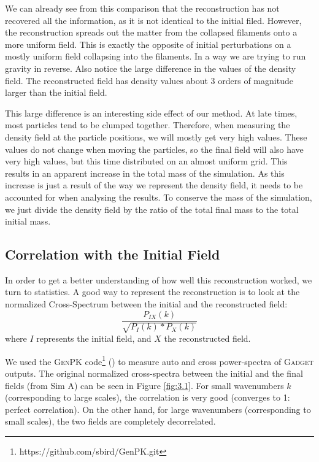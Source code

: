 We can already see from this comparison that the reconstruction has not recovered all the information, as it is not identical to the initial filed. However, the reconstruction spreads out the matter from the collapsed filaments onto a more uniform field. This is exactly the opposite of initial perturbations on a mostly uniform field collapsing into the filaments. In a way we are trying to run gravity in reverse. Also notice the large difference in the values of the density field. The reconstructed field has density values about 3 orders of magnitude larger than the initial field. 

This large difference is an interesting side effect of our method. At late times, most particles tend to be clumped together. Therefore, when measuring the density field at the particle positions, we will mostly get very high values. These values do not change when moving the particles, so the final field will also have very high values, but this time distributed on an almost uniform grid. This results in an apparent increase in the total mass of the simulation. As this increase is just a result of the way we represent the density field, it needs to be accounted for when analysing the results. To conserve the mass of the simulation, we just divide the density field by the ratio of the total final mass to the total initial mass.

\subsection{Correlation with the Initial Field}


In order to get a better understanding of how well this reconstruction worked, we turn to statistics. A good way to represent the reconstruction  is to look at the normalized Cross-Spectrum between the initial and the reconstructed field: $$ \frac{P_{IX}(k)}{\sqrt{P_I(k) * P_X(k)}} $$ where $I$ represents the initial field, and $X$ the reconstructed field. 

We used the \textsc{GenPK} code\footnote{https://github.com/sbird/GenPK.git} (\cite{2017ascl.soft06006B}) to measure auto and cross power-spectra of \textsc{Gadget} outputs. The original normalized cross-spectra between the initial and the final fields (from Sim A) can be seen in Figure \ref{fig:3.1}. For small wavenumbers $k$ (corresponding to large scales), the correlation is very good (converges to 1: perfect correlation). On the other hand, for large wavenumbers (corresponding to small scales), the two fields are completely decorrelated. 

